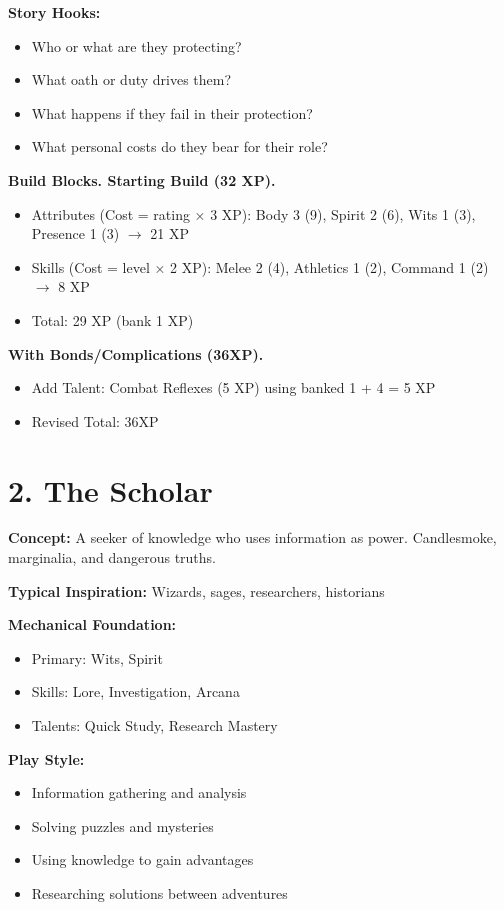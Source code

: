 \documentclass[11pt,twoside,openany]{book}
\begin{document}
\textbf{Story Hooks:}
\begin{itemize}
\item Who or what are they protecting?
\item What oath or duty drives them?
\item What happens if they fail in their protection?
\item What personal costs do they bear for their role?
\end{itemize}

\textbf{Build Blocks. Starting Build (32 XP).}
\begin{itemize}
\item Attributes (Cost = rating × 3 XP): Body 3 (9), Spirit 2 (6), Wits 1 (3), Presence 1 (3) $\rightarrow$ 21 XP
\item Skills (Cost = level × 2 XP): Melee 2 (4), Athletics 1 (2), Command 1 (2) $\rightarrow$ 8 XP
\item Total: 29 XP (bank 1 XP)
\end{itemize}

\textbf{With Bonds/Complications (36XP).}
\begin{itemize}
\item Add Talent: Combat Reflexes (5 XP) using banked 1 + 4 = 5 XP
\item Revised Total: 36XP
\end{itemize}

\section*{2. The Scholar} 

\textbf{Concept:} A seeker of knowledge who uses information as power. Candlesmoke, marginalia, and dangerous truths.

\textbf{Typical Inspiration:} Wizards, sages, researchers, historians

\textbf{Mechanical Foundation:}
\begin{itemize}
\item Primary: Wits, Spirit
\item Skills: Lore, Investigation, Arcana
\item Talents: Quick Study, Research Mastery
\end{itemize}

\textbf{Play Style:}
\begin{itemize}
\item Information gathering and analysis
\item Solving puzzles and mysteries
\item Using knowledge to gain advantages
\item Researching solutions between adventures
\end{itemize}
\end{document}
